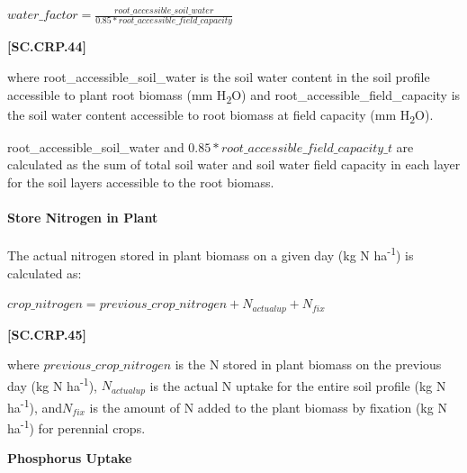     \begin{center}
        \(water\_factor= \frac{root\_accessible\_soil\_water}{0.85 * root\_accessible\_field\_capacity} \) 
    \end{center}
        \vspace{0.5cm}
    
            {\raggedleft \textbf{[SC.CRP.44]}\par}
            \vspace{0.5cm}

where root\_accessible\_soil\_water is the soil water content in the soil profile accessible to plant root biomass (mm H\textsubscript{2}O) and root\_accessible\_field\_capacity is the soil water content accessible to root biomass at field capacity (mm H\textsubscript{2}O).

root\_accessible\_soil\_water and \(0.85 * root\_accessible\_field\_capacity\_t\) are calculated as the sum of total soil water and soil water field capacity in each layer for the soil layers accessible to the root biomass.

\paragraph{Store Nitrogen in Plant}
\vspace{-0.25cm}

The actual nitrogen stored in plant biomass on a given day (kg N ha\textsuperscript{-1}) is calculated as:
   \vspace{0.2cm}

    \begin{center}
        \(crop\_nitrogen=previous\_crop\_nitrogen+N_{actualup}+N_{fix} \) 
    \end{center}
        \vspace{0.5cm}
    
            {\raggedleft \textbf{[SC.CRP.45]}\par}
            \vspace{0.5cm}

where \(previous\_crop\_nitrogen\) is the N stored in plant biomass on the previous day (kg N ha\textsuperscript{-1}), \(N_{actualup}\) is the actual N uptake for the entire soil profile (kg N ha\textsuperscript{-1}), and\(N_{fix}\) is the amount of N added to the plant biomass by fixation (kg N ha\textsuperscript{-1}) for perennial crops. 
\vspace{0.2cm}

\textbf{\large Phosphorus Uptake}
\vspace{0.2cm}

